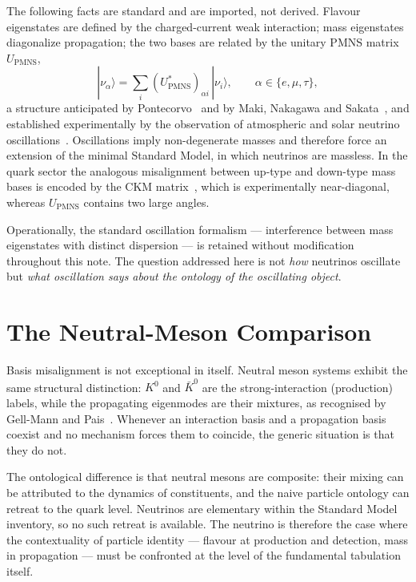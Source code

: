 \documentclass[11pt,a4paper]{article}
\theoremstyle{definition}
\newcommand{\Upmns}{U_{\mathrm{PMNS}}}
\newcommand{\ket}[1]{|#1\rangle}
\begin{document}
    The following facts are standard and are imported, not derived.
    Flavour eigenstates are defined by the charged-current weak interaction; mass eigenstates diagonalize
    propagation; the two bases are related by the unitary PMNS matrix $\Upmns$,
    \[
      \ket{\nu_\alpha} = \sum_i (\Upmns^*)_{\alpha i}\,\ket{\nu_i}, \qquad \alpha \in \{e,\mu,\tau\},
    \]
    a structure anticipated by Pontecorvo~\cite{Pontecorvo1957} and by Maki, Nakagawa and
    Sakata~\cite{MakiNakagawaSakata1962}, and established experimentally by the observation of atmospheric and
    solar neutrino oscillations~\cite{Fukuda1998, Ahmad2002}.
    Oscillations imply non-degenerate masses and therefore force an extension of the minimal Standard Model, in
    which neutrinos are massless.
    In the quark sector the analogous misalignment between up-type and down-type mass bases is encoded by the
    CKM matrix~\cite{Cabibbo1963, KobayashiMaskawa1973}, which is experimentally near-diagonal, whereas
    $\Upmns$ contains two large angles.

    Operationally, the standard oscillation formalism --- interference between mass eigenstates with distinct
    dispersion --- is retained without modification throughout this note.
    The question addressed here is not \emph{how} neutrinos oscillate but \emph{what oscillation says about the
    ontology of the oscillating object}.

  \section{The Neutral-Meson Comparison}
    \label{sec:neutral-mesons}

    Basis misalignment is not exceptional in itself.
    Neutral meson systems exhibit the same structural distinction: $K^0$ and $\bar K^0$ are the strong-interaction
    (production) labels, while the propagating eigenmodes are their mixtures, as recognised by Gell-Mann and
    Pais~\cite{GellMannPais1955}.
    Whenever an interaction basis and a propagation basis coexist and no mechanism forces them to coincide, the
    generic situation is that they do not.

    The ontological difference is that neutral mesons are composite: their mixing can be attributed to the
    dynamics of constituents, and the naive particle ontology can retreat to the quark level.
    Neutrinos are elementary within the Standard Model inventory, so no such retreat is available.
    The neutrino is therefore the case where the contextuality of particle identity --- flavour at
    production and detection, mass in propagation --- must be confronted at the level of the fundamental
    tabulation itself.
\end{document}

